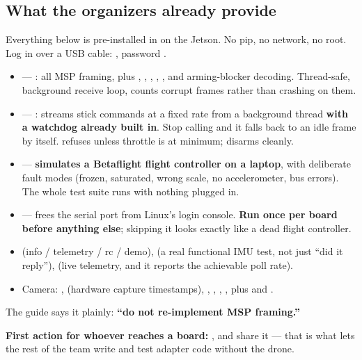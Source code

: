 \subsection*{What the organizers already provide}\label{sec:provided}

Everything below is pre-installed in  on the Jetson. No pip, no network, no root.
Log in over a USB cable: , password .

\begin{itemize}\sloppy
\item {} --- : all MSP framing, plus ,
, , , ,  and
arming-blocker decoding. Thread-safe, background receive loop, counts corrupt frames rather than
crashing on them.
\item {} --- : streams stick commands at a fixed rate from a
background thread \textbf{with a watchdog already built in}. Stop calling  and
it falls back to an idle frame by itself.  refuses unless throttle is at minimum;
 disarms cleanly.
\item {} --- \textbf{simulates a Betaflight flight controller on a laptop}, with
deliberate fault modes (frozen, saturated, wrong scale, no accelerometer, bus errors). The whole test
suite runs with nothing plugged in.
\item {} --- frees the serial port from Linux's login console.
\textbf{Run once per board before anything else}; skipping it looks exactly like a dead flight
controller.
\item {} (info / telemetry / rc / demo),  (a real functional
IMU test, not just ``did it reply''),  (live telemetry, and it
reports the achievable poll rate).
\item Camera: ,  (hardware capture timestamps),
, , , , plus
 and .
\end{itemize}

The guide says it plainly: \textbf{``do not re-implement MSP framing.''}

\textbf{First action for whoever reaches a board:} , and
share it --- that is what lets the rest of the team write and test adapter code without the drone.

